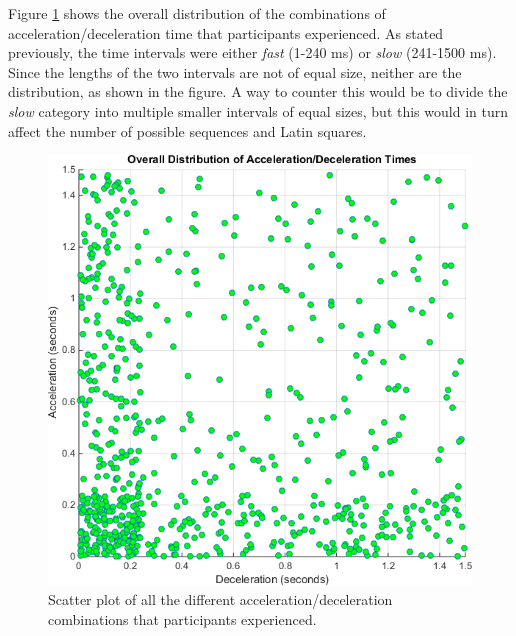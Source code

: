 Figure \ref{fig:overallDistribution} shows the overall distribution of the combinations of acceleration/deceleration time that participants experienced. As stated previously, the time intervals were either \textit{fast} (1-240 ms) or \textit{slow} (241-1500 ms). Since the lengths of the two intervals are not of equal size, neither are the distribution, as shown in the figure. A way to counter this would be to divide the \textit{slow} category into multiple smaller intervals of equal sizes, but this would in turn affect the number of possible sequences and Latin squares.



\begin{figure}[htbp]
\centering
\includegraphics[width=0.55\columnwidth]{Pics/Classes/overall_distribution}
\caption{Scatter plot of all the different acceleration/deceleration combinations that participants experienced.}
\label{fig:overallDistribution}
\end{figure}

